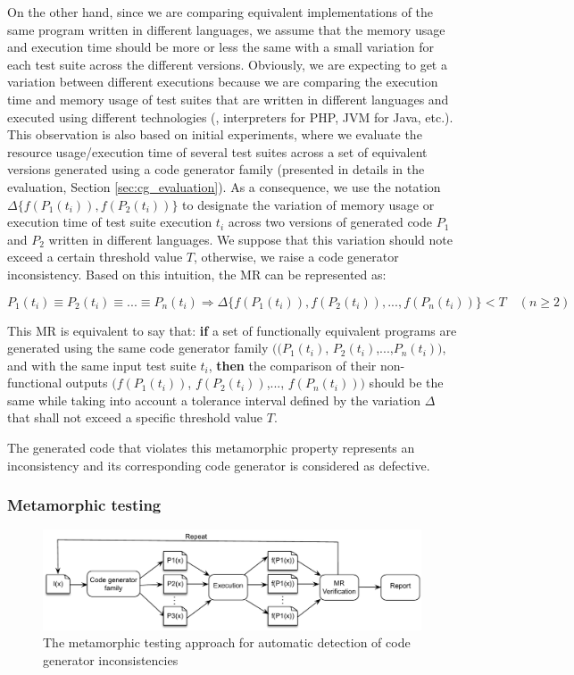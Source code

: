On the other hand, since we are comparing equivalent implementations of the same program written in different languages, we assume that the memory usage and execution time should be more or less the same with a small variation for each test suite across the different versions. Obviously, we are expecting to get a variation between different executions because we are comparing the execution time and memory usage of test suites that are written in different languages and executed using different technologies (\eg, interpreters for PHP, JVM for Java, etc.). 
This observation is also based on initial experiments, where we evaluate the resource usage/execution time of several test suites across a set of equivalent versions generated using a code generator family (presented in details in the evaluation, Section \ref{sec:cg_evaluation}). As a consequence, we use the notation $\Delta\{f(P_{1}(t_{i})), f(P_{2}(t_{i}))\}$ to designate the variation of memory usage or execution time of test suite execution $t_{i}$ across two versions of generated code $P_{1}$ and $P_{2}$ written in different languages. We suppose that this variation should note exceed a certain threshold value $T$, otherwise, we raise a code generator inconsistency.
Based on this intuition, the MR can be represented as:

\begin{equation}
P_{1}(t_{i}) \equiv P_{2}(t_{i}) \equiv ... \equiv P_{n}(t_{i}) \Rightarrow \Delta\{f(P_{1}(t_{i})), f(P_{2}(t_{i})),..., f(P_{n}(t_{i}))\} < T\quad (n\geqslant 2)
\end{equation}

This MR is equivalent to say that: \textbf{if} a set of functionally equivalent programs are generated using the same code generator family $((P_{1}(t_{i})$, $P_{2}(t_{i})$,...,$P_{n}(t_{i}))$, and with the same input test suite $t_{i}$, \textbf{then} the comparison of their non-functional outputs $(f(P_{1}(t_{i}))$, $f(P_{2}(t_{i}))$,..., $f(P_{n}(t_{i})))$ should be the same while taking into account a tolerance interval defined by the variation $\Delta$ that shall not exceed a specific threshold value $T$.

The generated code that violates this metamorphic property represents an inconsistency and its corresponding code generator is considered as defective.

\subsubsection[(Steps 2, 3, and 4)]{Metamorphic testing}
\label{sec:cg-Metamorphic testing}
\begin{figure}[h]
	\centering
	\includegraphics[width=1.\linewidth]{chapitre4/fig/MT}
	\caption{The metamorphic testing approach for automatic detection of code generator inconsistencies}
	\label{fig:cg_MT}
\end{figure}

